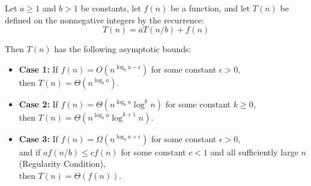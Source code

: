\begin{theorem}
	\label{lem:master}
	Let $a \ge 1$ and $b > 1$ be constants, let $f(n)$ be a function, and let $T(n)$ be defined on the nonnegative integers by the recurrence:
	\[ T(n) = aT(n/b) + f(n) \]

	Then $T(n)$ has the following asymptotic bounds:
	\begin{itemize}
		\item \textbf{Case 1:} If $f(n) = O(n^{\log_b a - \epsilon})$ for some constant $\epsilon > 0$, \\
		      then $T(n) = \Theta(n^{\log_b a})$.

		\item \textbf{Case 2:} If $f(n) = \Theta(n^{\log_b a} \log^k n)$ for some constant $k \ge 0$, \\
		      then $T(n) = \Theta(n^{\log_b a} \log^{k+1} n)$.

		\item \textbf{Case 3:} If $f(n) = \Omega(n^{\log_b a + \epsilon})$ for some constant $\epsilon > 0$, \\
		      and if $a f(n/b) \le c f(n)$ for some constant $c < 1$ and all sufficiently large $n$ (Regularity Condition), \\
		      then $T(n) = \Theta(f(n))$.
	\end{itemize}
\end{theorem}

